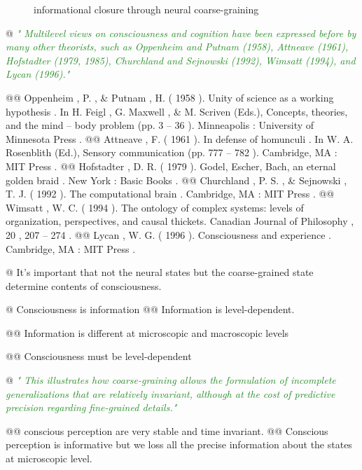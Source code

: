 \documentclass[utf8]{article}
\newenvironment{ants}
			{
			 \begin{easylist}[itemize]		
		 	}
			{
			\end{easylist}
			}
\newcommand{\rewrite}[1]{\textcolor{ForestGreen}{\textit{"#1"}}\newline}
\newcommand{\includegraphicsTodo}[2][]{%
			\tcbox[%
				adjusted title=\LARGE To Be Modified,
				halign title=right,
				colbacktitle=Orange!75!White,
				coltitle=Black,
				colframe=Red!60!White,
				boxrule=1mm,
				colback=white%
				]{\texttt{[image: \#2]}}}
\begin{document}
		
		
		\begin{figure}[H]
			\includegraphicsTodo[width=\textwidth]{CGandIC.png}
			\caption{informational closure through neural coarse-graining}
			\label{fig:CGandIC}
		\end{figure}
	
		
		\begin{ants}
			
			@ \rewrite{ 
				Multilevel views on consciousness and cognition have been expressed before by many other theorists, such as Oppenheim and Putnam (1958), Attneave (1961), Hofstadter (1979, 1985), Churchland and Sejnowski (1992), Wimsatt (1994), and Lycan (1996).} \cite{pennartz2017consciousness}
			
				@@ Oppenheim , P. , \& Putnam , H. ( 1958 ). Unity of science as a working hypothesis . In H. Feigl , G. Maxwell , \& M. Scriven (Eds.), Concepts, theories, and the mind – body problem (pp. 3 – 36 ). Minneapolis : University of Minnesota Press .
				@@ Attneave , F. ( 1961 ). In defense of homunculi . In W. A. Rosenblith (Ed.), Sensory communication (pp. 777 – 782 ). Cambridge, MA : MIT Press .
				@@ Hofstadter , D. R. ( 1979 ). Godel, Escher, Bach, an eternal golden braid . New York : Basic Books .
				@@ Churchland , P. S. , \& Sejnowski , T. J. ( 1992 ). The computational brain . Cambridge, MA : MIT Press .
				@@ Wimsatt , W. C. ( 1994 ). The ontology of complex systems: levels of organization, perspectives, and causal thickets. Canadian Journal of Philosophy , 20 , 207 – 274 .
				@@ Lycan ,  W. G.  ( 1996 ).  Consciousness and experience .  Cambridge, MA :  MIT Press .			
			
			
			
			
			@ It's important that not the neural states but the coarse-grained state determine contents of consciousness. 
			
			@ Consciousness is information 
				@@ Information is level-dependent.
				
				@@ Information is different at microscopic and macroscopic levels
				
				@@ Consciousness must be level-dependent 		
				
			
			@ \rewrite{
				This illustrates how coarse-graining allows the formulation of incomplete generalizations that are relatively invariant, although at the cost of predictive precision regarding fine-grained details.} \cite{price2007causation}
			
				@@ conscious perception are very stable and time invariant.
				@@ Conscious perception is informative but we loss all the precise information about the states at microscopic level. 
		\end{ants}
		   
\end{document}
